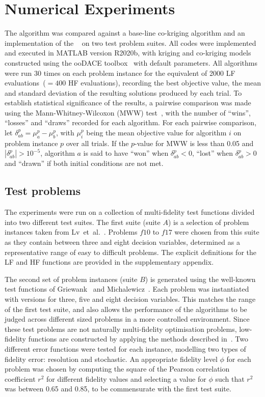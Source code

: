 \section{Numerical Experiments}\label{sec:exp}

The \AlgName{} algorithm was compared against a base-line co-kriging algorithm and an implementation of the \motos{}~\cite{xu2016mo2tos} on two test problem suites. All codes were implemented and executed in MATLAB version R2020b, with kriging and co-kriging models constructed using the ooDACE toolbox~\cite{oodace} with default parameters.
All algorithms were run 30 times on each problem instance for the equivalent of 2000 LF evaluations~($=400$ HF evaluations), recording the best objective value, the mean and standard deviation of the resulting solutions produced by each trial. To establish statistical significance of the results, a pairwise comparison was made using the Mann-Whitney-Wilcoxon (MWW) test~\cite{mann1947test}, with the number of ``wins'', ``losses'' and ``draws'' recorded for each algorithm. For each pairwise comparison, let $\delta^p_{ab} = \mu^p_a - \mu^p_b$, with $\mu^p_i$ being the mean objective value for algorithm $i$ on problem instance $p$ over all trials. If the $p$-value for MWW is less than 0.05 and $|\delta^p_{ab}| > 10^{-5}$, algorithm $a$ is said to have ``won'' when $\delta^p_{ab} < 0$, ``lost'' when $\delta^p_{ab} > 0$ and ``drawn'' if both initial conditions are not met.

\subsection{Test problems}
The experiments were run on a collection of multi-fidelity test functions divided into two different test suites. The first suite (suite $A$) is a selection of problem instances taken from Lv~et~al.~\cite{lv2021multi}. Problems $f10$ to $f17$ were chosen from this suite as they contain between three and eight decision variables, determined as a representative range of easy to difficult problems. The explicit definitions for the LF and HF functions are provided in the supplementary appendix.%

The second set of problem instances (suite $B$) is generated using the well-known test functions of Griewank~\cite{griewank1981generalized} and Michalewicz~\cite{michalewicz2013genetic}. Each problem was instantiated with versions for three, five and eight decision variables. This matches the range of the first test suite, and also allows the performance of the algorithms to be judged across different sized problems in a more controlled environment. Since these test problems are not naturally multi-fidelity optimisation problems, low-fidelity functions are constructed by applying the methods described in~\cite{wang2017generic}. Two different error functions were tested for each instance, modelling two types of fidelity error: resolution and stochastic. An appropriate fidelity level $\phi$ for each problem was chosen by computing the square of the Pearson correlation coefficient $r^2$ for different fidelity values and selecting a value for $\phi$ such that $r^2$ was between 0.65 and 0.85, to be commensurate with the first test suite.

